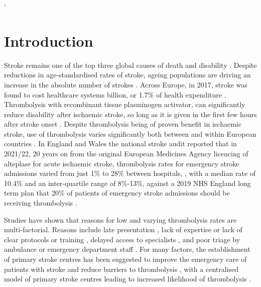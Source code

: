 `\section{Introduction}



Stroke remains one of the top three global causes of death and disability \cite{feigin_global_2021}. Despite reductions in age-standardised rates of stroke, ageing populations are driving an increase in the absolute number of strokes \cite{feigin_global_2021}. Across Europe, in 2017, stroke was found to cost healthcare systems  billion, or 1.7\% of health expenditure \cite{luengo-fernandez_economic_2020}. Thrombolysis with recombinant tissue plasminogen activator, can significantly reduce disability after ischaemic stroke, so long as it is given in the first few hours after stroke onset \cite{emberson_effect_2014}. Despite thrombolysis being of proven benefit in ischaemic stroke, use of thrombolysis varies significantly both between and within European countries \cite{aguiar_de_sousa_access_2019}. In England and Wales the national stroke audit reported that in 2021/22, 20 years on from the original European Medicines Agency licencing of alteplase for acute ischaemic stroke, thrombolysis rates for emergency stroke admissions varied from just 1\% to 28\% between hospitals, \cite{sentinel_national_stroke_audit_programme_ssnap_2022}, with a median rate of 10.4\% and an inter-quartile range of 8\%-13\%, against a 2019 NHS England long term plan that 20\% of patients of emergency stroke admissions should be receiving thrombolysis \cite{nhs_long_term_plan_2019}.


Studies have shown that reasons for low and varying thrombolysis rates are multi-factorial. Reasons include late presentation \cite{aguiar_de_sousa_access_2019}, lack of expertise \cite{aguiar_de_sousa_access_2019} or lack of clear protocols or training \cite{carter-jones_stroke_2011}, delayed access to specialists \cite{kamal_delays_2017}, and poor triage by ambulance or emergency department staff \cite{carter-jones_stroke_2011}. For many factors, the establishment of primary stroke centres has been suggested to improve the emergency care of patients with stroke and reduce barriers to thrombolysis \cite{carter-jones_stroke_2011}, with a centralised model of primary stroke centres leading to increased likelihood of thrombolysis \cite{lahr_proportion_2012, morris_impact_2014, hunter_impact_2013}. 


